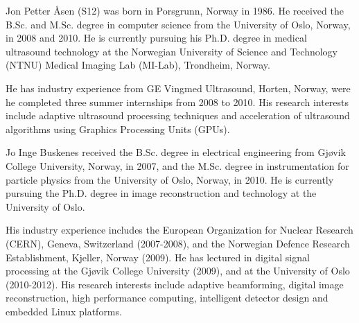 \documentclass[journal]{IEEEtran}
\begin{document}
\begin{IEEEbiography}{Jon Petter \AA{}sen}
(S12) was born in Porsgrunn, Norway in 1986. He received the B.Sc. and M.Sc. degree in computer science from the University of Oslo, Norway, in 2008 and 2010. He is currently pursuing his Ph.D. degree in medical ultrasound technology at the Norwegian University of Science and Technology (NTNU) Medical Imaging Lab (MI-Lab), Trondheim, Norway. 

He has industry experience from GE Vingmed Ultrasound, Horten, Norway, were he completed three summer internships from 2008 to 2010. His research interests include adaptive ultrasound processing techniques and acceleration of ultrasound algorithms using Graphics Processing Units (GPUs). 
\end{IEEEbiography}

\begin{IEEEbiography}{Jo Inge Buskenes}
received the B.Sc. degree in electrical engineering from Gj\o{}vik College University, Norway, in 2007, and the M.Sc. degree in instrumentation for particle physics from the University of Oslo, Norway, in 2010. He is currently pursuing the Ph.D. degree in image reconstruction and technology at the University of Oslo.

His industry experience includes the European Organization for Nuclear Research (CERN), Geneva, Switzerland (2007-2008), and the Norwegian Defence Research Establishment, Kjeller, Norway (2009). He has lectured in digital signal processing at the Gj\o{}vik College University (2009), and at the University of Oslo (2010-2012). His research interests include adaptive beamforming, digital image reconstruction, high performance computing, intelligent detector design and embedded Linux platforms.
\end{IEEEbiography}
\end{document}
